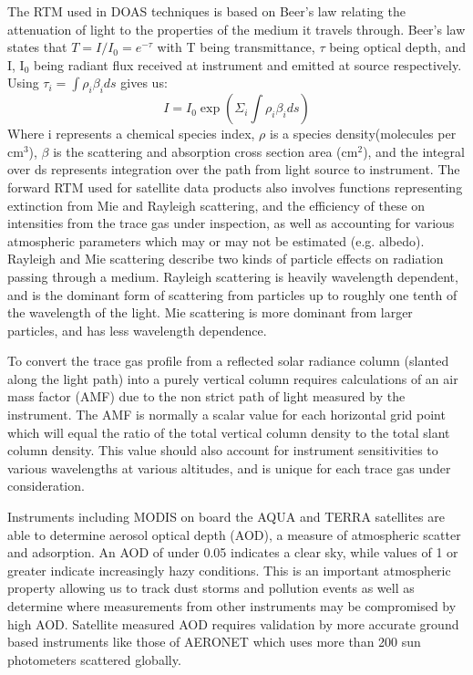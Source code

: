 The RTM used in DOAS techniques is based on Beer's law relating the attenuation of light to the properties of the medium it travels through.
Beer's law states that $ T = I/I_0 = e^{-\tau} $ with T being transmittance, $\tau$ being optical depth, and I, I$_0$ being radiant flux received at instrument and emitted at source respectively.
Using 
$ \tau_i = \int \rho_i \beta_i ds $ gives us:
$$ I = I_0 \exp {\left( \Sigma_i \int \rho_i \beta_i ds \right) } $$
Where i represents a chemical species index, $\rho$ is a species density(molecules per cm$^3$), $\beta$ is the scattering and absorption cross section area (cm$^2$), and the integral over ds represents integration over the path from light source to instrument.
The forward RTM used for satellite data products also involves functions representing extinction from Mie and Rayleigh scattering, and the efficiency of these on intensities from the trace gas under inspection, as well as accounting for various atmospheric parameters which may or may not be estimated (e.g. albedo).
Rayleigh and Mie scattering describe two kinds of particle effects on radiation passing through a medium. Rayleigh scattering is heavily wavelength dependent, and is the dominant form of scattering from particles up to roughly one tenth of the wavelength of the light. Mie scattering is more dominant from larger particles, and has less wavelength dependence.

To convert the trace gas profile from a reflected solar radiance column (slanted along the light path) into a purely vertical column requires calculations of an air mass factor (AMF) due to the non strict path of light measured by the instrument.
The AMF is normally a scalar value for each horizontal grid point which will equal the ratio of the total vertical column density to the total slant column density. This value should also account for instrument sensitivities to various wavelengths at various altitudes, and is unique for each trace gas under consideration.

Instruments including MODIS on board the AQUA and TERRA satellites are able to determine aerosol optical depth (AOD), a measure of atmospheric scatter and adsorption. 
An AOD of under 0.05 indicates a clear sky, while values of 1 or greater indicate increasingly hazy conditions.
This is an important atmospheric property allowing us to track dust storms and pollution events as well as determine where measurements from other instruments may be compromised by high AOD.
Satellite measured AOD requires validation by more accurate ground based instruments like those of AERONET which uses more than 200 sun photometers scattered globally. 